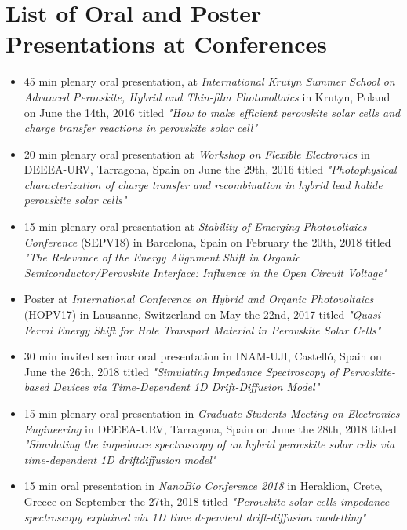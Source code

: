 \documentclass[b5paper, 12pt, openright]{book} %
\begin{document}
\chapter*{List of Oral and Poster Presentations at Conferences}
	\begin{itemize}
		\item 45 min plenary oral presentation, at \textit{International Krutyn Summer School on Advanced Perovskite, Hybrid and Thin-film Photovoltaics} in Krutyn, Poland on June the 14th, 2016 titled \textit{"How to make efficient perovskite solar cells and charge transfer reactions in perovskite solar cell"}
		\item 20 min plenary oral presentation at \textit{Workshop on Flexible Electronics} in DEEEA-URV, Tarragona, Spain on June the 29th, 2016 titled \textit{"Photophysical characterization of charge transfer and recombination in hybrid lead halide perovskite solar cells"}
		\item 15 min plenary oral presentation at \textit{Stability of Emerging Photovoltaics Conference} (SEPV18) in Barcelona, Spain on February the 20th, 2018 titled \textit{"The Relevance of the Energy Alignment Shift in Organic Semiconductor/Perovskite Interface: Influence in the Open Circuit Voltage"}
		\item Poster at \textit{International Conference on Hybrid and Organic Photovoltaics} (HOPV17) in Lausanne, Switzerland on May the 22nd, 2017 titled \textit{"Quasi-Fermi Energy Shift for Hole Transport Material in Perovskite Solar Cells"}
		\item 30 min invited seminar oral presentation in INAM-UJI, Castelló, Spain on June the 26th, 2018 titled \textit{"Simulating Impedance Spectroscopy of Pervoskite-based Devices via Time-Dependent 1D Drift-Diffusion Model"}
		\item 15 min plenary oral presentation in \textit{Graduate Students Meeting on Electronics Engineering} in DEEEA-URV, Tarragona, Spain on June the 28th, 2018 titled \textit{"Simulating the impedance spectroscopy of an hybrid perovskite solar cells via time-dependent 1D driftdiffusion model"}
		\item 15 min oral presentation in \textit{NanoBio Conference 2018} in Heraklion, Crete, Greece on September the 27th, 2018 titled \textit{"Perovskite solar cells impedance spectroscopy explained via 1D time dependent drift-diffusion modelling"}
	\end{itemize}

	\printbibliography[category=mypapers, title=List of Publications]

	\printbibliography[notcategory=mypapers]
\end{document}
